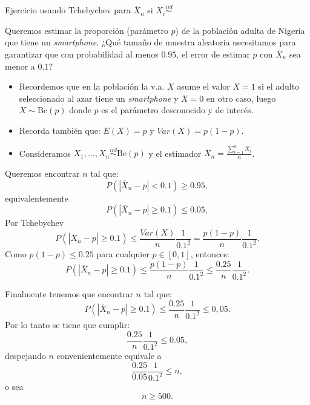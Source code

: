 \documentclass{beamer}
\theoremstyle{definition}
\begin{document}
\begin{frame}{\color{rosee} Ejercicio usando Tchebychev para $\overline{X}_n$ si $X_i \stackrel{iid}{\sim}$}\small

    Queremos estimar la proporci\'on (parámetro $p$) de la poblaci\'on adulta de Nigeria  que tiene un \textit{smartphone}. ¿Qu\'e tama\~no de muestra aleatoria necesitamos para garantizar que con probabilidad al menos $0.95$, el error de estimar $p$ con $\overline{X}_{n}$ sea menor a $0.1$?

  \medskip
\begin{itemize}
    \item Recordemos que en la población la v.a. $X$ asume el valor $X=1$ si el adulto seleccionado al azar tiene un  \textit{smartphone} y $X=0$ en otro caso, luego $X\sim \text{Be}(p)$ donde $p$ es el parámetro desconocido y de interés.\medskip
    \item Recorda también que: $E(X)=p$ y $Var(X) = p(1-p)$.
     \item Consideramos {\small $X_1,\dots,X_n \stackrel{iid}{\sim} \text{Be}(p)$ }y el estimador {\small$\overline{X}_{n}=\frac{\sum_{i=1}^nX_i}{n}$}.
\end{itemize}
\end{frame}

\begin{frame}{\color{rosee}} \small

    Queremos encontrar $n$ tal que:
    \[P\left( \left\vert \overline{X}_{n}-p\right\vert < 0.1\right) \geq 0.95,\]
    equivalentemente
    \[P\left( \left\vert \overline{X}_{n}-p\right\vert \geq 0.1\right) \leq 0.05,\]
    Por Tchebychev
    \[ P\left( \left\vert \overline{X}_{n}-p\right\vert \geq 0.1 \right)
    \leq \frac{Var(X)}{n} \frac{1}{0.1^{2}} = \frac{p(1-p)}{n}
    \frac{1}{0.1^{2}}.\]
    Como  $p(1-p)\leq 0.25$ para cualquier $p\in[0,1]$, entonces:
    \[ P\left( \left\vert \overline{X}_{n}-p\right\vert \geq 0.1 \right)
    \leq \frac{p(1-p)}{n}
    \frac{1}{0.1^{2}} \leq\frac{0.25}{n} \frac{1}{0.1^{2}}.\]

\end{frame}

\begin{frame}{\color{gray}  } \small
Finalmente tenemos que encontrar $n$ tal que:
    \[P\left( \left\vert \overline{X}_{n}-p\right\vert \geq 0.1 \right) 
    \leq \frac{0.25}{n} \frac{1}{0.1^{2}} \leq 0,05.\]
Por lo tanto se tiene que cumplir:
    \[ \frac{0.25}{n} \frac{1}{0.1^{2}} \leq 0.05, \]
despejando $n$ convenientemente equivale a 
    \[ \frac{0.25}{0.05} \frac{1}{0.1^{2}} \leq n,\]
    o sea
    \[ n\geq 500.\]

\end{frame}
\end{document}
